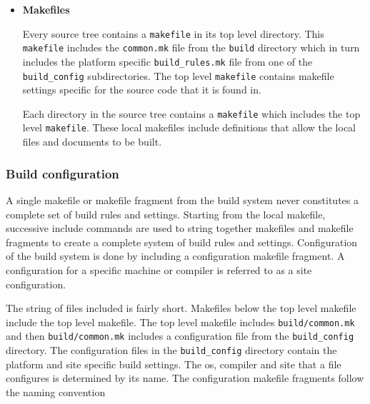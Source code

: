 \begin{itemize}


\item{{\bf Makefiles}}

Every source tree contains a {\tt makefile} in its top level directory. This
{\tt makefile} includes the {\tt common.mk} file from the {\tt build} directory
which in turn includes the platform specific {\tt build\_rules.mk} file from
one of the {\tt build\_config} subdirectories. The top level {\tt makefile}
contains makefile settings specific for the source code that it is found in.

Each directory in the source tree contains a {\tt makefile} which includes
the top level {\tt makefile}. These local makefiles include definitions that
allow the local files and documents to be built.
\end{itemize}

\subsubsection{Build configuration}

A single makefile or makefile fragment from the build system never
constitutes a complete set of build rules and settings.  Starting from
the local makefile, successive include commands are used to string
together makefiles and makefile fragments to create a complete system
of build rules and settings.  Configuration of the build system is
done by including a configuration makefile fragment. A configuration for a
specific machine or compiler is referred to as a site configuration.

The string of files included is fairly short.  Makefiles below the top
level makefile include the top level makefile. The top level makefile
includes {\tt build/common.mk} and then {\tt build/common.mk} includes a
configuration file from the {\tt build\_config} directory.  The configuration
files in the {\tt build\_config} directory contain the platform and site
specific build settings.  The os, compiler and site that a file
configures is determined by its name.  The configuration makefile
fragments follow the naming convention

